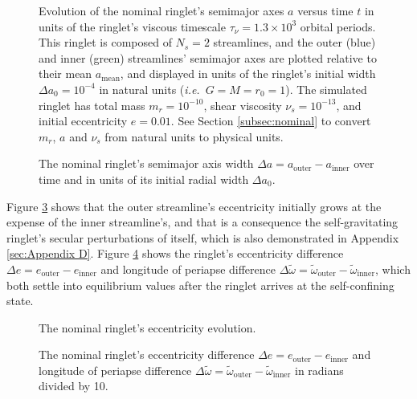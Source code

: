 \documentclass[preprint]{aastex62}
\begin{document}
\begin{figure}
\caption{Evolution of the nominal ringlet's semimajor axes $a$
versus time $t$ in units of the ringlet's viscous timescale
$\tau_\nu=1.3\times10^3$ orbital periods. This ringlet is composed of $N_s=2$ streamlines,
and the outer (blue) and inner (green) streamlines' semimajor axes are plotted relative
to their mean $a_{\text{mean}}$, and displayed in units of the ringlet's
initial width $\Delta a_0 = 10^{-4}$ in natural units ({\it i.e.}\ $G=M=r_0=1$).
The simulated ringlet has total mass $m_r=10^{-10}$, shear viscosity $\nu_s=10^{-13}$,
and initial eccentricity $e=0.01$. See Section \ref{subsec:nominal} to convert
$m_r$, $a$ and $\nu_s$ from natural units to physical units.
\label{fig:a_nominal}}
\end{figure}

\begin{figure}
\caption{
\label{fig:da_nominal}
The nominal ringlet's semimajor axis width $\Delta a = a_{\text{outer}} - a_{\text{inner}}$ over time
and in units of its initial radial width $\Delta a_0$.}
\end{figure}

Figure \ref{fig:e_nominal} shows that the outer streamline's eccentricity initially grows at the
expense of the inner streamline's, and that is a consequence the self-gravitating ringlet's
secular perturbations of itself, which is also demonstrated in Appendix \ref{sec:Appendix D}. 
Figure \ref{fig:de_nominal} shows
the ringlet's eccentricity difference $\Delta e = e_{\text{outer}} - e_{\text{inner}}$
and longitude of periapse difference
$\Delta\tilde{\omega} = \tilde{\omega}_{\text{outer}} - \tilde{\omega}_{\text{inner}}$,
which both settle into equilibrium values after the ringlet arrives at the self-confining
state.

\begin{figure}
\caption{
\label{fig:e_nominal}
The nominal ringlet's eccentricity evolution.}
\end{figure}

\begin{figure}
    \caption{
        \label{fig:de_nominal}
        The nominal ringlet's eccentricity difference $\Delta e = e_{\text{outer}} - e_{\text{inner}}$
        and longitude of periapse difference
        $\Delta\tilde{\omega} = \tilde{\omega}_{\text{outer}} - \tilde{\omega}_{\text{inner}}$
        in radians divided by 10.
    }
\end{figure}
\end{document}

